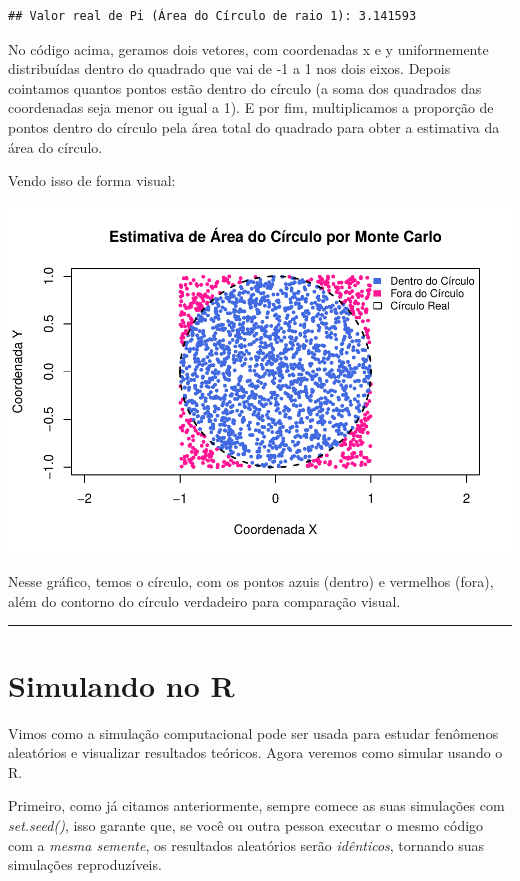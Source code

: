 \documentclass[
]{book}
\begin{document}
\begin{verbatim}
## Valor real de Pi (Área do Círculo de raio 1): 3.141593
\end{verbatim}

No código acima, geramos dois vetores, com coordenadas x e y uniformemente distribuídas dentro do quadrado que vai de -1 a 1 nos dois eixos. Depois cointamos quantos pontos estão dentro do círculo (a soma dos quadrados das coordenadas seja menor ou igual a 1). E por fim, multiplicamos a proporção de pontos dentro do círculo pela área total do quadrado para obter a estimativa da área do círculo.

Vendo isso de forma visual:

\begin{center}\includegraphics{AED_files/figure-latex/circulo-1} \end{center}

Nesse gráfico, temos o círculo, com os pontos azuis (dentro) e vermelhos (fora), além do contorno do círculo verdadeiro para comparação visual.

\begin{center}\rule{0.5\linewidth}{0.5pt}\end{center}

\section{Simulando no R}\label{simulando-no-r}

Vimos como a simulação computacional pode ser usada para estudar fenômenos aleatórios e visualizar resultados teóricos. Agora veremos como simular usando o R.

Primeiro, como já citamos anteriormente, sempre comece as suas simulações com \emph{set.seed()}, isso garante que, se você ou outra pessoa executar o mesmo código com a \emph{mesma semente}, os resultados aleatórios serão \emph{idênticos}, tornando suas simulações reproduzíveis.
\end{document}

